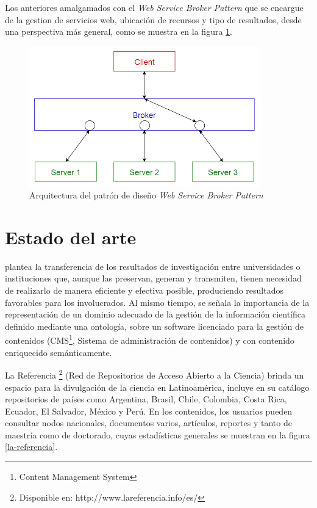  Los anteriores amalgamados con el \textit{Web Service Broker Pattern} que se encargue de la gestion de servicios web, ubicación de recursos y tipo de resultados, desde una perspectiva más general, como se muestra en la figura \ref{web_service_pattern}.
 
 \begin{figure}[!ht]
    \centering
    \includegraphics[width=10cm]{figures/web_service_broker_pattern.png} %
    \caption{Arquitectura del patrón de diseño \textit{Web Service Broker Pattern}} %
    \label{web_service_pattern}
\end{figure}


\section{Estado del arte}

\cite{DrJulioSoler} plantea la transferencia de los resultados de investigación entre universidades o instituciones que, aunque las preservan, generan y transmiten, tienen necesidad de realizarlo de manera eficiente y efectiva posible, produciendo resultados favorables para los involucrados. Al mismo tiempo, se señala la importancia de la representación de un dominio adecuado de la gestión de la información científica definido mediante una ontología, sobre un software licenciado para la gestión de contenidos (CMS\footnote{Content Management System}, Sistema de administración de contenidos) y con contenido enriquecido semánticamente. \newline

La Referencia\cite{LaReferencia} \footnote{Disponible en: http://www.lareferencia.info/es/} (Red de Repositorios de Acceso Abierto a la Ciencia) brinda un espacio para la divulgación de la ciencia en Latinoamérica, incluye en su catálogo repositorios de países como Argentina, Brasil, Chile, Colombia, Costa Rica, Ecuador, El Salvador, México y Perú. En los contenidos, los usuarios pueden consultar nodos nacionales, documentos varios, artículos, reportes y  tanto de maestría como de doctorado, cuyas estadísticas generales se muestran en la figura \ref{la-referencia}.

